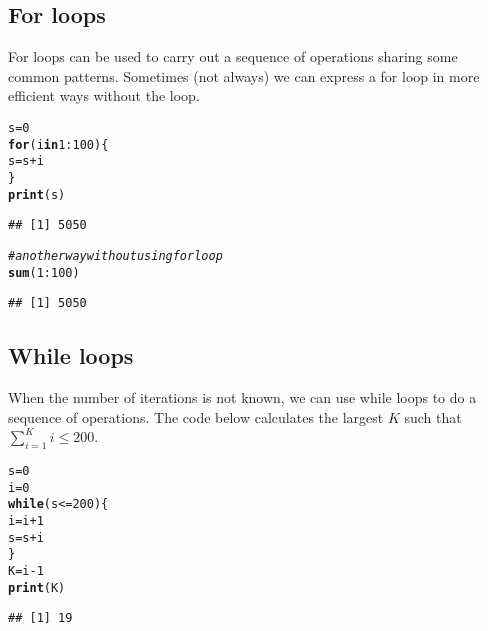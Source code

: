 \documentclass[12pt]{article}\usepackage[]{graphicx}\usepackage[]{color}
\makeatletter
\newcommand{\hlnum}[1]{\textcolor[rgb]{0.686,0.059,0.569}{#1}}%
\newcommand{\hlcom}[1]{\textcolor[rgb]{0.678,0.584,0.686}{\textit{#1}}}%
\newcommand{\hlopt}[1]{\textcolor[rgb]{0,0,0}{#1}}%
\newcommand{\hlstd}[1]{\textcolor[rgb]{0.345,0.345,0.345}{#1}}%
\newcommand{\hlkwa}[1]{\textcolor[rgb]{0.161,0.373,0.58}{\textbf{#1}}}%
\newcommand{\hlkwb}[1]{\textcolor[rgb]{0.69,0.353,0.396}{#1}}%
\newcommand{\hlkwd}[1]{\textcolor[rgb]{0.737,0.353,0.396}{\textbf{#1}}}%
\newenvironment{kframe}{%
 \def\at@end@of@kframe{}%
 \ifinner\ifhmode%
  \def\at@end@of@kframe{\end{minipage}}%
  \begin{minipage}{\columnwidth}%
 \fi\fi%
 \def\FrameCommand##1{\hskip\@totalleftmargin \hskip-\fboxsep
 \colorbox{shadecolor}{##1}\hskip-\fboxsep
     \hskip-\linewidth \hskip-\@totalleftmargin \hskip\columnwidth}%
 \MakeFramed {\advance\hsize-\width
   \@totalleftmargin\z@ \linewidth\hsize
   \@setminipage}}%
 {\par\unskip\endMakeFramed%
 \at@end@of@kframe}
\newenvironment{knitrout}{}{} %
\makeatother
\begin{document}
\subsection{For loops}
For loops can be used to carry out a sequence of operations sharing some common patterns. Sometimes (not always) we can express a for loop in more efficient ways without the loop.

\begin{knitrout}
\color{fgcolor}\begin{kframe}
\begin{alltt}
\hlstd{s} \hlkwb{=} \hlnum{0}
\hlkwa{for}\hlstd{(i} \hlkwa{in} \hlnum{1}\hlopt{:}\hlnum{100}\hlstd{)\{}
  \hlstd{s} \hlkwb{=} \hlstd{s} \hlopt{+} \hlstd{i}
\hlstd{\}}
\hlkwd{print}\hlstd{(s)}
\end{alltt}
\begin{verbatim}
## [1] 5050
\end{verbatim}
\begin{alltt}
\hlcom{# another way without using for loop}
\hlkwd{sum}\hlstd{(}\hlnum{1}\hlopt{:}\hlnum{100}\hlstd{)}
\end{alltt}
\begin{verbatim}
## [1] 5050
\end{verbatim}
\end{kframe}
\end{knitrout}

\subsection{While loops}
When the number of iterations is not known, we can use while loops to do a sequence of operations. The code below calculates the largest $K$ such that $\sum_{i=1}^{K}i\leq 200$.
\begin{knitrout}
\color{fgcolor}\begin{kframe}
\begin{alltt}
\hlstd{s} \hlkwb{=} \hlnum{0}
\hlstd{i} \hlkwb{=} \hlnum{0}
\hlkwa{while}\hlstd{(s}\hlopt{<=}\hlnum{200}\hlstd{)\{}
  \hlstd{i} \hlkwb{=} \hlstd{i} \hlopt{+} \hlnum{1}
  \hlstd{s} \hlkwb{=} \hlstd{s} \hlopt{+} \hlstd{i}
\hlstd{\}}
\hlstd{K} \hlkwb{=} \hlstd{i} \hlopt{-} \hlnum{1}
\hlkwd{print}\hlstd{(K)}
\end{alltt}
\begin{verbatim}
## [1] 19
\end{verbatim}
\end{kframe}
\end{knitrout}
\end{document}
